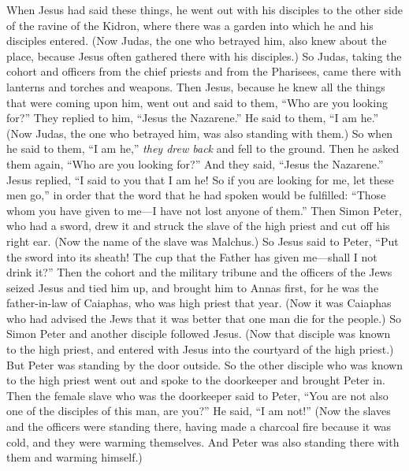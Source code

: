 \begin{biblechapter} %
 When Jesus had said these things, he went out with his disciples to the other side of the ravine of the Kidron, where there was a garden into which he and his disciples entered.
\verse (Now Judas, the one who betrayed him, also knew about the place, because Jesus often gathered there with his disciples.)
\verse So Judas, taking the cohort and officers from the chief priests and from the Pharisees, came there with lanterns and torches and weapons.
\verse Then Jesus, because he knew all the things that were coming upon him, went out and said to them, “Who are you looking for?”
\verse They replied to him, “Jesus the Nazarene.” He said to them, “I am he.” (Now Judas, the one who betrayed him, was also standing with them.)
\verse So when he said to them, “I am he,” \textit{they drew back} and fell to the ground.
\verse Then he asked them again, “Who are you looking for?” And they said, “Jesus the Nazarene.”
\verse Jesus replied, “I said to you that I am he! So if you are looking for me, let these men go,”
\verse in order that the word that he had spoken would be fulfilled: “Those whom you have given to me—I have not lost anyone of them.”
\verse Then Simon Peter, who had a sword, drew it and struck the slave of the high priest and cut off his right ear. (Now the name of the slave was Malchus.)
\verse So Jesus said to Peter, “Put the sword into its sheath! The cup that the Father has given me—shall I not drink it?”
 Then the cohort and the military tribune and the officers of the Jews seized Jesus and tied him up,
\verse and brought him to Annas first, for he was the father-in-law of Caiaphas, who was high priest that year.
\verse (Now it was Caiaphas who had advised the Jews that it was better that one man die for the people.)
 So Simon Peter and another disciple followed Jesus. (Now that disciple was known to the high priest, and entered with Jesus into the courtyard of the high priest.)
\verse But Peter was standing by the door outside. So the other disciple who was known to the high priest went out and spoke to the doorkeeper and brought Peter in.
\verse Then the female slave who was the doorkeeper said to Peter, “You are not also one of the disciples of this man, are you?” He said, “I am not!”
\verse (Now the slaves and the officers were standing there, having made a charcoal fire because it was cold, and they were warming themselves. And Peter was also standing there with them and warming himself.)

\end{biblechapter}
